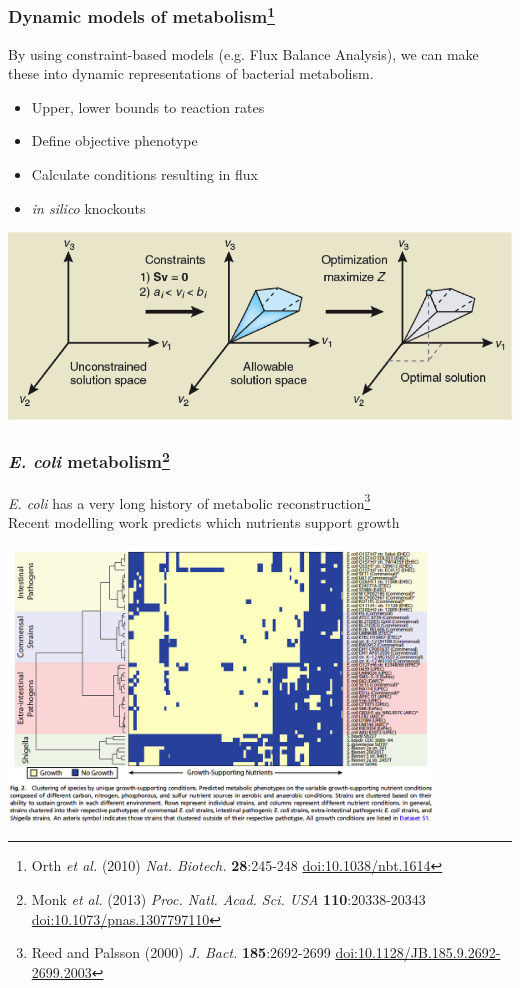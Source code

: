 \begin{frame}
  \frametitle{Dynamic models of metabolism\footnote{\tiny{Orth \textit{et al.} (2010) \textit{Nat. Biotech.} \textbf{28}:245-248 \href{http://dx.doi.org/10.1038/nbt.1614}{doi:10.1038/nbt.1614}}}}
  By using constraint-based models (e.g. Flux Balance Analysis), we can make these into dynamic representations of bacterial metabolism.
  \begin{itemize}
    \item Upper, lower bounds to reaction rates
    \item Define objective phenotype
    \item Calculate conditions resulting in flux
    \item \textit{in silico} knockouts
  \end{itemize}
  \begin{center}
      \includegraphics[width=1\textwidth]{images/fba} 
  \end{center}
\end{frame}

\begin{frame}
  \frametitle{\textit{E. coli} metabolism\footnote{\tiny{Monk \textit{et al.} (2013) \textit{Proc. Natl. Acad. Sci. USA} \textbf{110}:20338-20343 \href{http://dx.doi.org/10.1073/pnas.1307797110}{doi:10.1073/pnas.1307797110}}}}
  \textit{E. coli} has a very long history of metabolic reconstruction\footnote{\tiny{Reed and Palsson (2000) \textit{J. Bact.} \textbf{185}:2692-2699 \href{http://dx.doi.org/10.1128/JB.185.9.2692-2699.2003}{doi:10.1128/JB.185.9.2692-2699.2003}}}\\
  Recent modelling work predicts which nutrients support growth
  \begin{center}
      \includegraphics[width=0.85\textwidth]{images/e_coli_growth} 
  \end{center}
\end{frame}

